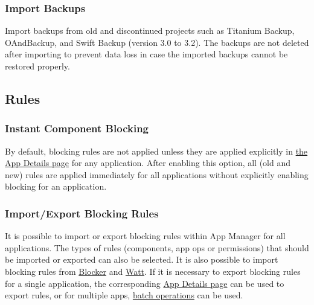 \subsubsection{Import Backups} %
Import backups from old and discontinued projects such as Titanium Backup, OAndBackup, and Swift Backup (version 3.0 to 3.2).
The backups are not deleted after importing to prevent data loss in case the imported backups cannot be restored properly.


\subsection{Rules}\label{subsec:rules} %

\subsubsection{Instant Component Blocking}\label{subsubsec:instant-component-blocking} %
By default, blocking rules are not applied unless they are applied explicitly in \hyperref[sec:app-details-page]{the App Details page} for any application.
After enabling this option, all (old and new) rules are applied immediately for all applications without explicitly enabling blocking for an application.


\subsubsection{Import/Export Blocking Rules} %
It is possible to import or export blocking rules within App Manager for all applications. The types of rules (components, app ops or permissions) that should be imported or exported can also be selected.
It is also possible to import blocking rules from \href{https://github.com/lihenggui/blocker}{Blocker} and \href{https://github.com/tuyafeng/Watt}{Watt}.
If it is necessary to export blocking rules for a single application, the corresponding \hyperref[sec:app-details-page]{App Details page} can be used to export rules, or for multiple apps, \hyperref[subsec:batch-operations]{batch operations} can be used.



